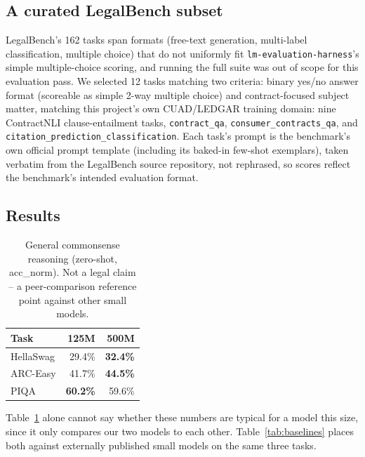 \documentclass[11pt]{article}
\begin{document}
\subsection{A curated LegalBench subset}
\label{sec:legalbench}

LegalBench's 162 tasks span formats (free-text generation, multi-label
classification, multiple choice) that do not uniformly fit
\texttt{lm-evaluation-harness}'s simple multiple-choice scoring, and
running the full suite was out of scope for this evaluation pass. We
selected 12 tasks matching two criteria: binary yes/no answer format
(scoreable as simple 2-way multiple choice) and contract-focused subject
matter, matching this project's own CUAD/LEDGAR training domain: nine
ContractNLI clause-entailment tasks, \texttt{contract\_qa},
\texttt{consumer\_\allowbreak contracts\_\allowbreak qa}, and
\texttt{citation\_\allowbreak prediction\_\allowbreak classification}. Each task's prompt is the
benchmark's own official prompt template (including its baked-in few-shot
exemplars), taken verbatim from the LegalBench source repository, not
rephrased, so scores reflect the benchmark's intended evaluation format.

\subsection{Results}

\begin{table}[h]
\centering
\caption{General commonsense reasoning (zero-shot, acc\_norm). Not a legal
claim -- a peer-comparison reference point against other small models.}
\label{tab:general}
\begin{tabular}{lrr}
\toprule
\textbf{Task} & \textbf{125M} & \textbf{500M} \\
\midrule
HellaSwag & 29.4\% & \textbf{32.4\%} \\
ARC-Easy & 41.7\% & \textbf{44.5\%} \\
PIQA & \textbf{60.2\%} & 59.6\% \\
\bottomrule
\end{tabular}
\end{table}

Table~\ref{tab:general} alone cannot say whether these numbers are typical
for a model this size, since it only compares our two models to each
other. Table~\ref{tab:baselines} places both against externally published
small models on the same three tasks.
\end{document}
